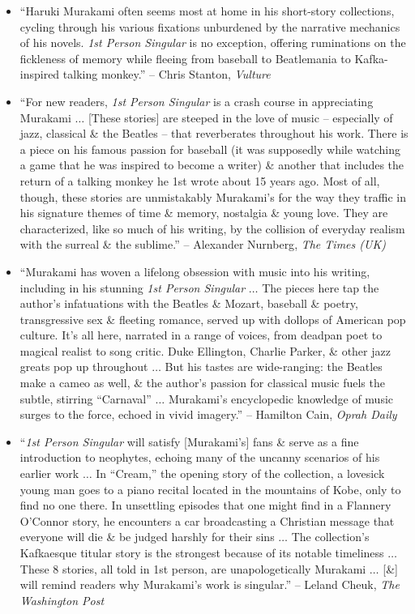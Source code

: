 \documentclass{article}
\begin{document}
\begin{enumerate}
\begin{itemize}
		\item ``{\sc Haruki Murakami} often seems most at home in his short-story collections, cycling through his various fixations unburdened by the narrative mechanics of his novels. {\it1st Person Singular} is no exception, offering ruminations on the fickleness of memory while fleeing from baseball to Beatlemania to Kafka-inspired talking monkey.'' -- {\sc Chris Stanton}, {\it Vulture}
		\item ``For new readers, {\it1st Person Singular} is a crash course in appreciating {\sc Murakami} $\ldots$ [These stories] are steeped in the love of music -- especially of jazz, classical \& the Beatles -- that reverberates throughout his work. There is a piece on his famous passion for baseball (it was supposedly while watching a game that he was inspired to become a writer) \& another that includes the return of a talking monkey he 1st wrote about 15 years ago. Most of all, though, these stories are unmistakably {\sc Murakami}'s for the way they traffic in his signature themes of time \& memory, nostalgia \& young love. They are characterized, like so much of his writing, by the collision of everyday realism with the surreal \& the sublime.'' -- {\sc Alexander Nurnberg}, {\it The Times (UK)}
		\item ``{\sc Murakami} has woven a lifelong obsession with music into his writing, including in his stunning {\it1st Person Singular} $\ldots$ The pieces here tap the author's infatuations with the Beatles \& {\sc Mozart}, baseball \& poetry, transgressive sex \& fleeting romance, served up with dollops of American pop culture. It's all here, narrated in a range of voices, from deadpan poet to magical realist to song critic. {\sc Duke Ellington, Charlie Parker}, \& other jazz greats pop up throughout $\ldots$ But his tastes are wide-ranging: the Beatles make a cameo as well, \& the author's passion for classical music fuels the subtle, stirring ``Carnaval'' $\ldots$ {\sc Murakami}'s encyclopedic knowledge of music surges to the force, echoed in vivid imagery.'' -- {\sc Hamilton Cain}, {\it Oprah Daily}
		\item ``{\it1st Person Singular} will satisfy [{\sc Murakami's}] fans \& serve as a fine introduction to neophytes, echoing many of the uncanny scenarios of his earlier work $\ldots$ In ``Cream,'' the opening story of the collection, a lovesick young man goes to a piano recital located in the mountains of Kobe, only to find no one there. In unsettling episodes that one might find in a Flannery O'Connor story, he encounters a car broadcasting a Christian message that everyone will die \& be judged harshly for their sins $\ldots$ The collection's Kafkaesque titular story is the strongest because of its notable timeliness $\ldots$ These 8 stories, all told in 1st person, are unapologetically {\sc Murakami} $\ldots$ [\&] will remind readers why {\sc Murakami}'s work is singular.'' -- {\sc Leland Cheuk}, {\it The Washington Post}

\end{itemize}
\end{enumerate}
\end{document}
